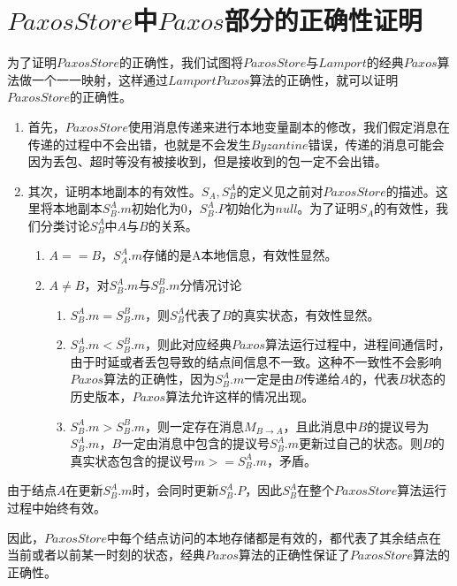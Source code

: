 \section{$PaxosStore$中$Paxos$部分的正确性证明}
	\par 为了证明$PaxosStore$的正确性，我们试图将$PaxosStore$与$Lamport$的经典$Paxos$算法做一个一一映射，这样通过$Lamport Paxos$算法的正确性，就可以证明$PaxosStore$的正确性。
\begin{enumerate}
\item
	\par 首先，$PaxosStore$使用消息传递来进行本地变量副本的修改，我们假定消息在传递的过程中不会出错，也就是不会发生$Byzantine$错误，传递的消息可能会因为丢包、超时等没有被接收到，但是接收到的包一定不会出错。
\item
	\par 其次，证明本地副本的有效性。$S_A,S_B^A$的定义见之前对$PaxosStore$的描述。这里将本地副本$S_B^A.m$初始化为0，$S_B^A.P$初始化为$null$。为了证明$S_A$的有效性，我们分类讨论$S_B^A$中$A$与$B$的关系。
	\begin{enumerate}
	\item $A==B$，$S_A^A.m$存储的是A本地信息，有效性显然。
	\item $A\ne B$，对$S_B^A.m$与$S_B^B.m$分情况讨论
		\begin{enumerate}
		\item $S_B^A.m = S_B^B.m$，则$S_B^A$代表了$B$的真实状态，有效性显然。
		\item $S_B^A.m < S_B^B.m$，则此对应经典$Paxos$算法运行过程中，进程间通信时，由于时延或者丢包导致的结点间信息不一致。这种不一致性不会影响$Paxos$算法的正确性，因为$S_B^A.m$一定是由$B$传递给$A$的，代表$B$状态的历史版本，$Paxos$算法允许这样的情况出现。
		\item $S_B^A.m > S_B^B.m$，则一定存在消息$M_{B\rightarrow A}$，且此消息中$B$的提议号为$S_B^A.m$，$B$一定由消息中包含的提议号$S_B^A.m$更新过自己的状态。则$B$的真实状态包含的提议号$m>=S_B^A.m$，矛盾。
		\end{enumerate}
	\end{enumerate}
\end{enumerate}
	\par 由于结点$A$在更新$S_B^A.m$时，会同时更新$S_B^A.P$，因此$S_B^A$在整个$PaxosStore$算法运行过程中始终有效。
	\par 因此，$PaxosStore$中每个结点访问的本地存储都是有效的，都代表了其余结点在当前或者以前某一时刻的状态，经典$Paxos$算法的正确性保证了$PaxosStore$算法的正确性。
	

